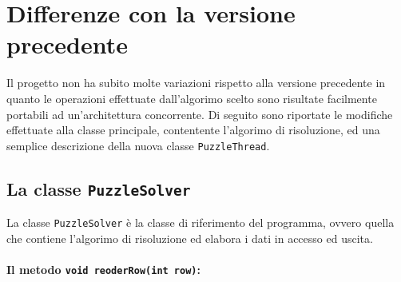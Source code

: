 %
%

\section{Differenze con la versione precedente}
Il progetto non ha subito molte variazioni rispetto alla versione precedente in quanto le operazioni effettuate dall'algorimo scelto sono
risultate facilmente portabili ad un'architettura concorrente. Di seguito sono riportate le modifiche effettuate alla classe principale,
contentente l'algorimo di risoluzione, ed una semplice descrizione della nuova classe \texttt{PuzzleThread}.



\subsection{La classe \texttt{PuzzleSolver}}
La classe \texttt{PuzzleSolver} è la classe di riferimento del programma, ovvero quella che contiene l'algorimo di risoluzione ed elabora
i dati in accesso ed uscita.

\paragraph{Il metodo \texttt{void reoderRow(int row)}:}
